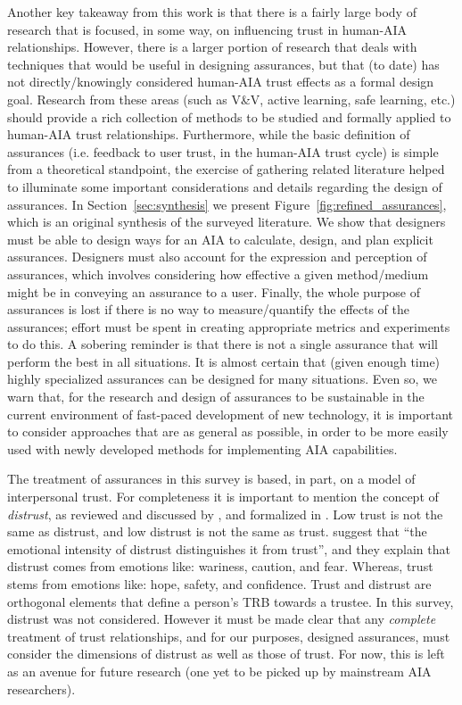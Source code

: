     Another key takeaway from this work is that there is a fairly large body of research that is focused, in some way, on influencing trust in human-AIA relationships. However, there is a larger portion of research that deals with techniques that would be useful in designing assurances, but that (to date) has not directly/knowingly considered human-AIA trust effects as a formal design goal. 
    Research from these areas (such as V\&V, active learning, safe learning, etc.) should provide a rich collection of methods to be studied and formally applied to human-AIA trust relationships.
Furthermore, while the basic definition of assurances (i.e. feedback to user trust, in the human-AIA trust cycle) is simple from a theoretical standpoint, the exercise of gathering related literature helped to illuminate some important considerations and details regarding the design of assurances. In Section~\ref{sec:synthesis} we present Figure~\ref{fig:refined_assurances}, which is an original synthesis of the surveyed literature. We show that designers must be able to design ways for an AIA to calculate, design, and plan explicit assurances. Designers must also account for the expression and perception of assurances, which involves considering how effective a given method/medium might be in conveying an assurance to a user. 
Finally, the whole purpose of assurances is lost if there is no way to measure/quantify the effects of the assurances; effort must be spent in creating appropriate metrics and experiments to do this. A sobering reminder is that there is not a single assurance that will perform the best in all situations. It is almost certain that (given enough time) highly specialized assurances can be designed for many situations. Even so, we warn that, for the research and design of assurances to be sustainable in the current environment of fast-paced development of new technology, it is important to consider approaches that are as general as possible, in order to be more easily used with newly developed methods for implementing AIA capabilities.

    The treatment of assurances in this survey is based, in part, on a model of interpersonal trust. For completeness it is important to mention the concept of \textit{distrust}, as reviewed and discussed by \citet{Lewicki1998-ox}, and formalized in \citet{McKnight2001-gz}. Low trust is not the same as distrust, and low distrust is not the same as trust. \citet{McKnight2001-gz} suggest that ``the emotional intensity of distrust distinguishes it from trust'', and they explain that distrust comes from emotions like: wariness, caution, and fear. Whereas, trust stems from emotions like: hope, safety, and confidence. Trust and distrust are orthogonal elements that define a person's TRB towards a trustee. In this survey, distrust was not considered. However it must be made clear that any \emph{complete} treatment of trust relationships, and for our purposes, designed assurances, must consider the dimensions of distrust as well as those of trust. For now, this is left as an avenue for future research (one yet to be picked up by mainstream AIA researchers).

